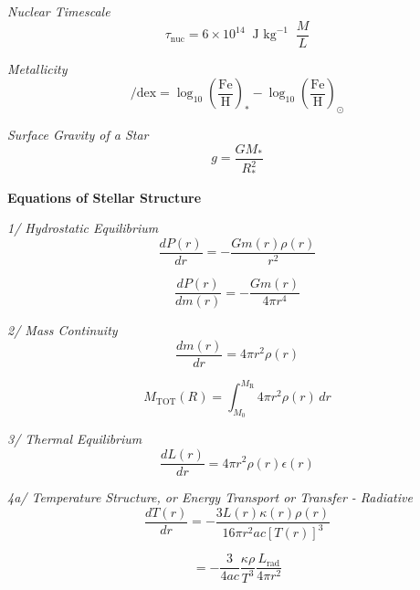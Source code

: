 \documentclass{article}
\begin{document}
\textit {Nuclear Timescale}
\begin{equation}
\tau_\mathrm{nuc} = 6 \times 10^{14} \; \; \text{J kg}^{-1} \; \; \frac {M}{L}
\end{equation}


\textit{Metallicity}
\begin{equation}
[\mathrm{Fe/H}] / \mathrm{dex} = \log_{10} \left( \frac{\mathrm{Fe}}{\mathrm{H}} \right)_* - \log_{10} \left( \frac{\mathrm{Fe}}{\mathrm{H}} \right)_\odot
\end{equation}


\textit{Surface Gravity of a Star}
\begin{equation}
g = \frac{G M_\mathrm{*}}{R^2_\mathrm{*}}
\end{equation}

\textbf {Equations of Stellar Structure}

\textit {1/ Hydrostatic Equilibrium}
\begin{equation}
\frac {dP(r)}{dr} = - \frac {G m(r) \rho(r)}{r^2}
\end{equation}


\begin{equation}
\frac {dP(r)}{dm(r)} = - \frac {G m(r)}{4 \pi r^4}
\end{equation}

\textit {2/ Mass Continuity}
\begin{equation}
\frac {dm(r)}{dr} = 4 \pi r^2 \rho(r)
\end{equation}

\begin{equation}
M_\mathrm{TOT}(R) = \int_{M_\mathrm{0}}^{M_\mathrm{R}} 4 \pi r^2 \rho(r) \,dr
\end{equation}

\textit {3/ Thermal Equilibrium}
\begin{equation}
\frac {dL(r)}{dr} = 4 \pi r^2 \rho(r) \epsilon(r)
\end{equation}
\begin{center}
\end{center}

\textit {4a/ Temperature Structure, or Energy Transport or Transfer - Radiative}
\begin{equation}
\frac {dT(r)}{dr} = - \frac {3 L(r) \kappa(r) \rho(r)}{16 \pi r^2 a c \left[T(r)\right]^3}
\end{equation}

\begin{equation}
 = - \frac {3}{4ac} \frac {\kappa \rho}{T^3} \frac {L_\mathrm{rad}}{4 \pi r^2}
\end{equation}
\end{document}
